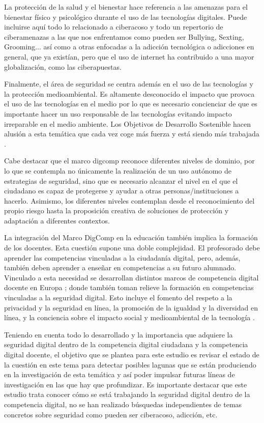 \documentclass[spanish]{textolivre}
\begin{document}
La protección de la salud y el bienestar hace referencia a las amenazas para el bienestar físico y psicológico durante el uso de las tecnologías digitales. Puede incluirse aquí todo lo relacionado a ciberacoso y todo un repertorio de ciberamenazas a las que nos enfrentamos como pueden ser Bullying, Sexting, Grooming... \cite{reset2022problemas} así como a otras enfocadas a la adicción tecnológica o adicciones en general, que ya existían, pero que el uso de internet ha contribuido a una mayor globalización, como las ciberapuestas.

Finalmente, el área de seguridad se centra además en el uso de las tecnologías y la protección medioambiental. Es altamente desconocido el impacto que provoca el uso de las tecnologías en el medio por lo que es necesario concienciar de que es importante hacer un uso responsable de las tecnologías evitando impacto irreparable en el medio ambiente. Los Objetivos de Desarrollo Sostenible hacen alusión a esta temática que cada vez coge más fuerza y está siendo más trabajada \cite{barragan2020teaching,tucho2020impacto,silva2023nivel}.

Cabe destacar que el marco digcomp reconoce diferentes niveles de dominio, por lo que se contempla no únicamente la realización de un uso autónomo de estrategias de seguridad, sino que es necesario alcanzar el nivel en el que el ciudadano es capaz de protegerse y ayudar a otras personas/instituciones a hacerlo. Asimismo, los diferentes niveles contemplan desde el reconocimiento del propio riesgo hasta la proposición creativa de soluciones de protección y adaptación a diferentes contextos.

La integración del Marco DigComp en la educación también implica la formación de los docentes. Esta cuestión supone una doble complejidad. El profesorado debe aprender las competencias vinculadas a la ciudadanía digital, pero, además, también deben aprender a enseñar en competencias a su futuro alumnado. Vinculado a esta necesidad se desarrollan distintos marcos de competencia digital docente en Europa \cite{redecker2017european,intef2017marco}; donde también toman relieve la formación en competencias vinculadas a la seguridad digital. Esto incluye el fomento del respeto a la privacidad y la seguridad en línea, la promoción de la igualdad y la diversidad en línea, y la conciencia sobre el impacto social y medioambiental de la tecnología \cite{rodriguez2023evaluacion}.

Teniendo en cuenta todo lo desarrollado y la importancia que adquiere la seguridad digital dentro de la competencia digital ciudadana y la competencia digital docente, el objetivo que se plantea para este estudio es revisar el estado de la cuestión en este tema para detectar posibles lagunas que se están produciendo en la investigación de esta temática y así poder impulsar futuras líneas de investigación en las que hay que profundizar. Es importante destacar que este estudio trata conocer cómo se está trabajando la seguridad digital dentro de la competencia digital, no se han realizado búsquedas independientes de temas concretos sobre seguridad como pueden ser ciberacoso, adicción, etc.
\end{document}
